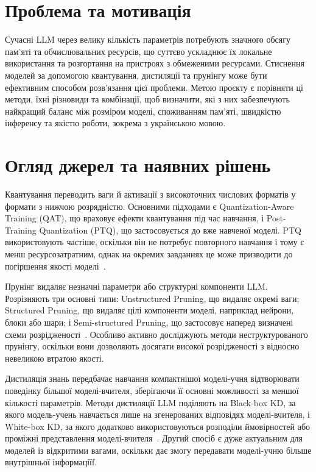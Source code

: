 \documentclass[ukrainian]{ucuproposal}
\begin{document}
\maketitlepage

\section{Проблема та мотивація}
Сучасні LLM через велику кількість параметрів потребують значного обсягу пам’яті та обчислювальних ресурсів, що суттєво ускладнює їх локальне використання та розгортання на пристроях з обмеженими ресурсами.
Стиснення моделей за допомогою квантування, дистиляції та прунінгу може бути ефективним способом розв’язання цієї проблеми.
Метою проєкту є порівняти ці методи, їхні різновиди та комбінації, щоб визначити, які з них забезпечують найкращий баланс між розміром моделі, споживанням пам’яті, швидкістю інференсу та якістю роботи, зокрема з українською мовою.
\section{Огляд джерел та наявних рішень}
Квантування переводить ваги й активації з високоточних числових форматів у формати з нижчою розрядністю.
Основними підходами є Quantization-Aware Training (QAT), що враховує ефекти квантування під час навчання, і Post-Training Quantization (PTQ), що застосовується до вже навченої моделі.
PTQ використовують частіше, оскільки він не потребує повторного навчання і тому є менш ресурсозатратним, однак на окремих завданнях це може призводити до погіршення якості моделі~\cite{edge_centric_ai}.

Прунінг видаляє незначні параметри або структурні компоненти LLM.
Розрізняють три основні типи: Unstructured Pruning, що видаляє окремі ваги; Structured Pruning, що видаляє цілі компоненти моделі, наприклад нейрони, блоки або шари; і Semi-structured Pruning, що застосовує наперед визначені схеми розрідженості~\cite{10.1162/tacl_a_00704}.
Особливо активно досліджують методи неструктурованого прунінгу, оскільки вони дозволяють досягати високої розрідженості з відносно невеликою втратою якості.

Дистиляція знань передбачає навчання компактнішої моделі-учня відтворювати поведінку більшої моделі-вчителя, зберігаючи її основні можливості за меншої кількості параметрів.
Методи дистиляції LLM поділяють на Black-box KD, за якого модель-учень навчається лише на згенерованих відповідях моделі-вчителя, і White-box KD, за якого додатково використовуються розподіли ймовірностей або проміжні представлення моделі-вчителя~\cite{10.1145/3699518}.
Другий спосіб є дуже актуальним для моделей із відкритими вагами, оскільки дає змогу передавати моделі-учню більше внутрішньої інформаціїf.
\end{document}
